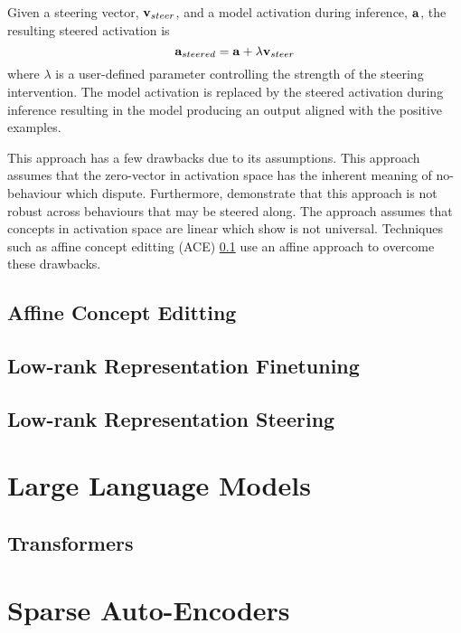 Given a steering vector, $\mathbf{v}_{steer}$, and a model activation during inference, $\mathbf{a}$, the resulting steered activation is
\[\mathbf{a}_{steered} = \mathbf{a} + \lambda\mathbf{v}_{steer}\]
where $\lambda$ is a user-defined parameter controlling the strength of the steering intervention.
The model activation is replaced by the steered activation during inference resulting in the model producing an output aligned with the positive examples.

This approach has a few drawbacks \cite{steerability, ACE, non-linear-features} due to its assumptions.
This approach assumes that the zero-vector in activation space has the inherent meaning of no-behaviour which \citet{ACE} dispute.
Furthermore, \citet{steerability} demonstrate that this approach is not robust across behaviours that may be steered along.
The approach assumes that concepts in activation space are linear which \citet{non-linear-features} show is not universal.
Techniques such as affine concept editting (ACE) \ref{ace} use an affine approach to overcome these drawbacks.

\subsection{Affine Concept Editting}
\label{ace}

\subsection{Low-rank Representation Finetuning}
\label{loreft}

\subsection{Low-rank Representation Steering}
\label{lorest}

\section{Large Language Models}

\subsection{Transformers}

\section{Sparse Auto-Encoders}
